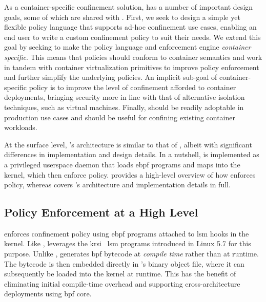As a container-specific confinement solution, \bpfcontain{} has a number of important
design goals, some of which are shared with \bpfbox{}. First, we seek to design a simple
yet flexible policy language that supports ad-hoc confinement use cases, enabling an
end user to write a custom confinement policy to suit their needs. We extend this goal by
seeking to make the policy language and enforcement engine \textit{container specific}.
This means that \bpfcontain{} policies should conform to container semantics and work in
tandem with container virtualization primitives to improve policy enforcement and further
simplify the underlying policies. An implicit sub-goal of container-specific policy is to
improve the level of confinement afforded to container deployments, bringing security more
in line with that of alternative isolation techniques, such as virtual machines. Finally,
\bpfcontain{} should be readily adoptable in production use cases and should be useful for
confining existing container workloads.

At the surface level, \bpfcontain{}'s architecture is similar to that of \bpfbox{}, albeit
with significant differences in implementation and design details. In a nutshell,
\bpfcontain{} is implemented as a privileged userspace daemon that loads \gls{ebpf}
programs and maps into the kernel, which then enforce policy.
 provides a high-level overview of how
\bpfcontain{} enforces policy, whereas  covers
\bpfcontain{}'s architecture and implementation details in full.

\subsection{Policy Enforcement at a High Level}%
\label{ss:bpfcontain-enforcement-overview}

\bpfcontain{} enforces confinement policy using \gls{ebpf} programs attached to \gls{lsm}
hooks in the kernel. Like \bpfbox{}, \bpfcontain{} leverages the
\gls{krsi}~\cite{singh2019_krsi} \gls{lsm} programs introduced in Linux 5.7 for this
purpose. Unlike \bpfbox{}, \bpfcontain{} generates \gls{bpf} bytecode at
\textit{compile time} rather than at runtime. The bytecode is then embedded directly in
\bpfcontain{}'s binary object file, where it can subsequently be loaded into the kernel at
runtime. This has the benefit of eliminating initial compile-time overhead and supporting
cross-architecture deployments using \gls{bpf} \gls{core}.

